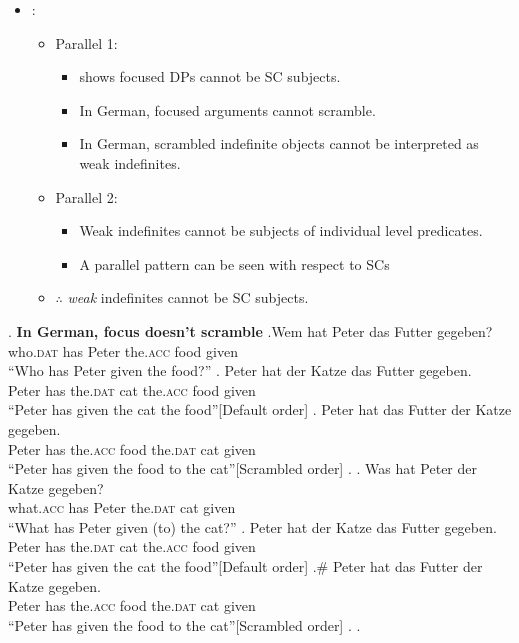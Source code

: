 \documentclass[GPFinal]{subfiles}
\begin{document}
\begin{itemize}
  \item \textcite{heycockkroch1999pseudocleft}:
    \begin{itemize}
      \item Parallel 1:
	\begin{itemize}
	  \item \Last shows focused DPs cannot be SC subjects.
	  \item In German, focused arguments cannot scramble. \parencite{lenerz1977zur}
	  \item In German, scrambled indefinite objects cannot be interpreted as weak indefinites. \parencite{dehoop1992case,diesing1992indefinites}
	\end{itemize}
      \item Parallel 2:
	\begin{itemize}
	  \item Weak indefinites cannot be subjects of individual level predicates. \parencite{milsark1974existential}
	  \item A parallel pattern can be seen with respect to SCs
	\end{itemize}
      \item $\therefore$ \textit{weak} indefinites cannot be SC subjects.
    \end{itemize}
\end{itemize}
\ex. \textbf{In German, focus doesn't scramble}
\ag.Wem hat Peter das Futter gegeben?\\
who.\textsc{dat} has Peter the.\textsc{acc} food given\\
``Who has Peter given the food?''
\ag. Peter hat der Katze das Futter gegeben.\\
Peter has the.\textsc{dat} cat the.\textsc{acc} food given\\
``Peter has given the cat the food''\hfill[Default order]
\bg. Peter hat das Futter der Katze gegeben.\\
Peter has the.\textsc{acc} food the.\textsc{dat} cat given\\
``Peter has given the food to the cat''\hfill[Scrambled order]
\z.
\bg. Was hat Peter der Katze gegeben?\\
what.\textsc{acc} has Peter the.\textsc{dat} cat given\\
``What has Peter given (to) the cat?''
\ag. Peter hat der Katze das Futter gegeben.\\
Peter has the.\textsc{dat} cat the.\textsc{acc} food given\\
``Peter has given the cat the food''\hfill[Default order]
\bg.\# Peter hat das Futter der Katze gegeben.\\
Peter has the.\textsc{acc} food the.\textsc{dat} cat given\\
``Peter has given the food to the cat''\hfill[Scrambled order]
\z.
\z.
\end{document}
